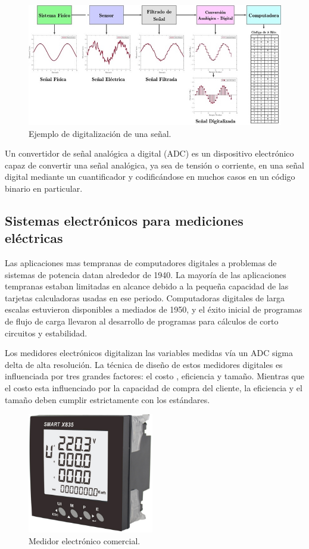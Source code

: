 \begin{figure}[h]
	\centering
	\includegraphics[width=120mm,keepaspectratio]{Figures/DigitalDAQ.jpg}
	\caption{Ejemplo de digitalización de una señal.}
	\label{fig:texmaker}
\end{figure}

Un convertidor de señal analógica a digital (ADC) es un dispositivo electrónico capaz de convertir una señal analógica, ya sea de tensión o corriente, en una señal digital mediante un cuantificador y codificándose en muchos casos en un código binario en particular. 

\subsection{Sistemas electrónicos para mediciones eléctricas}

Las aplicaciones mas tempranas de computadores digitales a problemas de sistemas de potencia datan alrededor de 1940. La mayoría de las aplicaciones tempranas estaban limitadas en alcance debido a la pequeña capacidad de las tarjetas calculadoras usadas en ese periodo. Computadoras digitales de larga escalas estuvieron disponibles a mediados de 1950, y el éxito inicial de programas de flujo de carga llevaron al desarrollo de programas para cálculos de corto circuitos y estabilidad.\citep{761852}

Los medidores electrónicos digitalizan las variables medidas vía un ADC sigma delta  de alta resolución. La técnica de diseño de estos medidores digitales es influenciada por tres grandes factores: el costo , eficiencia y tamaño. Mientras que el costo esta influenciado por la capacidad de compra del cliente, la eficiencia y el tamaño deben cumplir estrictamente con los estándares.\cite{articleDM}

\begin{figure}[h]
	\centering
	\includegraphics[width=55mm,keepaspectratio]{Figures/3931_1.png}
	\caption{Medidor electrónico comercial.}
	\label{fig:texmaker}
\end{figure}

